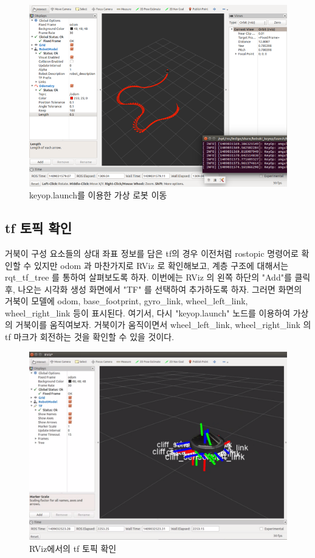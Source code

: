 \begin{figure}[h]
\centering\includegraphics[width=\columnwidth]{pictures/chapter10/rviz_kobuki_keyop_launch.png}
\caption{keyop.launch를 이용한 가상 로봇 이동}
\end{figure}

\subsection{tf 토픽 확인}

거북이 구성 요소들의 상대 좌표 정보를 담은 tf의 경우 이전처럼 rostopic 명령어로 확인할 수 있지만 odom 과 마찬가지로 RViz 로 확인해보고, 계층 구조에 대해서는 rqt\_tf\_tree 를 통하여 살펴보도록 하자. 이번에는 RViz 의 왼쪽 하단의 "Add"를 클릭 후, 나오는 시각화 생성 화면에서 "TF" 를 선택하여 추가하도록 하자. 그러면 화면의 거북이 모델에 odom, base\_footprint, gyro\_link, wheel\_left\_link, wheel\_right\_link 등이 표시된다. 여기서, 다시 "keyop.launch" 노드를 이용하여 가상의 거북이를 움직여보자. 거북이가 움직이면서 wheel\_left\_link, wheel\_right\_link 의 tf 마크가 회전하는 것을 확인할 수 있을 것이다.

\begin{figure}[h]
\centering\includegraphics[width=\columnwidth]{pictures/chapter8/rviz_kobuki_tf.png}
\caption{RViz에서의 tf 토픽 확인}
\end{figure}

